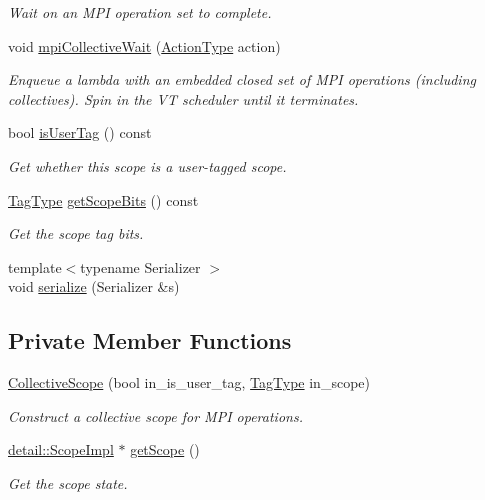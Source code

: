 \begin{DoxyCompactItemize}
\begin{DoxyCompactList}\small\item\em Wait on an M\+PI operation set to complete. \end{DoxyCompactList}\item 
void \hyperlink{structvt_1_1collective_1_1_collective_scope_a0ef41233afe63fc9ead8431e226af193}{mpi\+Collective\+Wait} (\hyperlink{namespacevt_ae0a5a7b18cc99d7b732cb4d44f46b0f3}{Action\+Type} action)
\begin{DoxyCompactList}\small\item\em Enqueue a lambda with an embedded closed set of M\+PI operations (including collectives). Spin in the VT scheduler until it terminates. \end{DoxyCompactList}\item 
bool \hyperlink{structvt_1_1collective_1_1_collective_scope_a8f8aa109ef27449f8fcb5eb378587196}{is\+User\+Tag} () const
\begin{DoxyCompactList}\small\item\em Get whether this scope is a user-\/tagged scope. \end{DoxyCompactList}\item 
\hyperlink{namespacevt_a84ab281dae04a52a4b243d6bf62d0e52}{Tag\+Type} \hyperlink{structvt_1_1collective_1_1_collective_scope_abed60df0901f32a362a908dccdcbe0fb}{get\+Scope\+Bits} () const
\begin{DoxyCompactList}\small\item\em Get the scope tag bits. \end{DoxyCompactList}\item 
{\footnotesize template$<$typename Serializer $>$ }\\void \hyperlink{structvt_1_1collective_1_1_collective_scope_aad6692a59ad1c0b3d87de4a7f67e9d8a}{serialize} (Serializer \&s)
\end{DoxyCompactItemize}
\subsection*{Private Member Functions}
\begin{DoxyCompactItemize}
\item 
\hyperlink{structvt_1_1collective_1_1_collective_scope_a2b51fd570c218fc089caaded29fd17c9}{Collective\+Scope} (bool in\+\_\+is\+\_\+user\+\_\+tag, \hyperlink{namespacevt_a84ab281dae04a52a4b243d6bf62d0e52}{Tag\+Type} in\+\_\+scope)
\begin{DoxyCompactList}\small\item\em Construct a collective scope for M\+PI operations. \end{DoxyCompactList}\item 
\hyperlink{structvt_1_1collective_1_1detail_1_1_scope_impl}{detail\+::\+Scope\+Impl} $\ast$ \hyperlink{structvt_1_1collective_1_1_collective_scope_a71b296b1ab86bf0814a4863327165f1c}{get\+Scope} ()
\begin{DoxyCompactList}\small\item\em Get the scope state. \end{DoxyCompactList}\end{DoxyCompactItemize}
